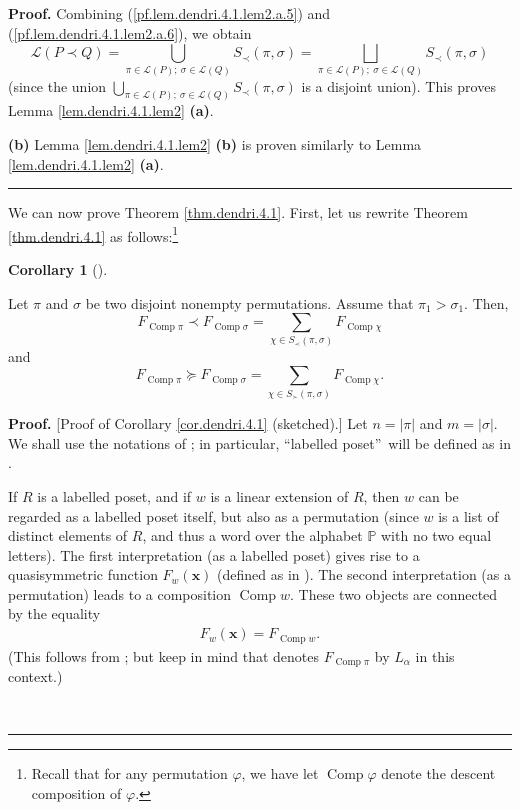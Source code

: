 \documentclass[numbers=enddot,12pt,final,onecolumn,notitlepage]{scrartcl}%
\theoremstyle{definition}
\newtheorem{coro}[theo]{Corollary}
\newenvironment{corollary}[1][]
{\begin{coro}[#1]\begin{leftbar}}
{\end{leftbar}\end{coro}}
\newenvironment{proof}[1][Proof]{\noindent\textbf{#1.} }{\ \rule{0.5em}{0.5em}}
\newenvironment{verlong}{}{}
\newcommand{\xx}{\mathbf{x}}
\let\sumnonlimits\sum
\renewcommand{\sum}{\sumnonlimits\limits}
\begin{document}
\begin{verlong}
\begin{proof}
Combining (\ref{pf.lem.dendri.4.1.lem2.a.5}) and
(\ref{pf.lem.dendri.4.1.lem2.a.6}), we obtain
\[
\mathcal{L}\left(  P\left.  \prec\right.  Q\right)  =\bigcup_{\pi
\in\mathcal{L}\left(  P\right)  ;\ \sigma\in\mathcal{L}\left(  Q\right)
}S_{\prec}\left(  \pi,\sigma\right)  =\bigsqcup_{\pi\in\mathcal{L}\left(
P\right)  ;\ \sigma\in\mathcal{L}\left(  Q\right)  }S_{\prec}\left(
\pi,\sigma\right)
\]
(since the union $\bigcup_{\pi\in\mathcal{L}\left(  P\right)  ;\ \sigma
\in\mathcal{L}\left(  Q\right)  }S_{\prec}\left(  \pi,\sigma\right)  $ is a
disjoint union). This proves Lemma \ref{lem.dendri.4.1.lem2} \textbf{(a)}.

\textbf{(b)} Lemma \ref{lem.dendri.4.1.lem2} \textbf{(b)} is proven similarly
to Lemma \ref{lem.dendri.4.1.lem2} \textbf{(a)}.
\end{proof}

We can now prove Theorem \ref{thm.dendri.4.1}.
First, let us rewrite Theorem \ref{thm.dendri.4.1} as follows:\footnote{Recall
that for any permutation $\varphi$, we have let $\operatorname*{Comp}\varphi$
denote the descent composition of $\varphi$.}

\begin{corollary}
\label{cor.dendri.4.1}Let $\pi$ and $\sigma$ be two disjoint nonempty
permutations. Assume that $\pi_{1}>\sigma_{1}$. Then,%
\[
F_{\operatorname*{Comp}\pi}\left.  \prec\right.  F_{\operatorname*{Comp}%
\sigma}=\sum_{\chi\in S_{\prec}\left(  \pi,\sigma\right)  }%
F_{\operatorname*{Comp}\chi}%
\]
and%
\[
F_{\operatorname*{Comp}\pi}\left.  \succeq\right.  F_{\operatorname*{Comp}%
\sigma}=\sum_{\chi\in S_{\succ}\left(  \pi,\sigma\right)  }%
F_{\operatorname*{Comp}\chi}.
\]

\end{corollary}

\begin{proof}
[Proof of Corollary \ref{cor.dendri.4.1} (sketched).] Let $n=\left\vert
\pi\right\vert $ and $m=\left\vert \sigma\right\vert $. We shall use the
notations of \cite[Section 5.2]{HopfComb}; in particular,
\textquotedblleft labelled poset\textquotedblright\ will be defined as in
\cite[Definition 5.2.1]{HopfComb}.

If $R$ is a labelled poset, and if $w$ is a linear extension of $R$,
then $w$ can be regarded as a labelled poset itself, but also as a
permutation (since $w$ is a list of distinct elements of $R$, and thus
a word over the alphabet $\mathbb{P}$ with no two equal letters).
The first interpretation (as a labelled poset)
gives rise to a quasisymmetric function
$F_w\left(\xx\right)$ (defined as in \cite[Definition 5.2.1]{HopfComb}).
The second interpretation (as a permutation) leads to a composition
$\operatorname{Comp} w$. These two objects are connected by the equality
\begin{align}
F_w \left( \xx \right) = F_{\operatorname{Comp} w} .
\label{pf.cor.dendri.4.1.Fw}
\end{align}
(This follows from \cite[Proposition 5.2.10]{HopfComb}; but keep in mind that
\cite[Proposition 5.2.10]{HopfComb} denotes $F_{\operatorname*{Comp}\pi}$
by $L_{\alpha}$ in this context.)


\end{proof}
\end{verlong}
\end{document}
